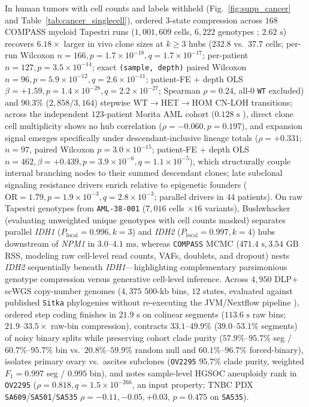 \documentclass[12pt]{article}
\begin{document}
In human tumors with cell counts and labels withheld (Fig.~\ref{fig:supp_cancer} and Table~\ref{tab:cancer_singlecell}), ordered 3-state compression across $168$ COMPASS myeloid Tapestri runs ($1,001,609$ cells, $6,222$ genotypes \cite{sollier2023compass}; $2.62\text{ s}$) recovers $6.18\times$ larger in vivo clone sizes at $k \ge 3$ hubs ($232.8$ vs.\ $37.7$ cells; per-run Wilcoxon $n=166, p = 1.7\times 10^{-18}, q = 1.7\times 10^{-17}$; per-patient $n=127, p = 3.5\times 10^{-14}$; exact \texttt{(sample, depth)} paired Wilcoxon $n=96, p = 5.9\times 10^{-12}, q = 2.6\times 10^{-11}$; patient-FE + depth OLS $\beta = +1.59, p = 1.4\times 10^{-28}, q = 2.2\times 10^{-27}$; Spearman $\rho = 0.24$, all-0 \texttt{WT} excluded) and $90.3\%$ ($2,858/3,164$) stepwise $\text{WT}\to\text{HET}\to\text{HOM}$ CN-LOH transitions; across the independent $123$-patient Morita AML cohort ($0.128\text{ s}$ \cite{morita2020clonal}), direct clone cell multiplicity shows no hub correlation ($\rho = -0.060, p = 0.197$), and expansion signal emerges specifically under descendant-inclusive lineage totals ($\rho = +0.331$; $n=97$, paired Wilcoxon $p = 3.0\times 10^{-15}$; patient-FE + depth OLS $n=462, \beta = +0.439, p = 3.9\times 10^{-6}, q = 1.1\times 10^{-5}$), which structurally couple internal branching nodes to their summed descendant clones; late subclonal signaling resistance drivers enrich relative to epigenetic founders ($\text{OR}=1.79, p = 1.9\times 10^{-3}, q = 2.8\times 10^{-3}$; parallel drivers in $44$ patients). On raw Tapestri genotypes from \texttt{AML-38-001} ($7,016$ cells $\times 16$ variants), Bushwhacker (evaluating unweighted unique genotypes with cell counts masked) separates parallel \textit{IDH1} ($P_{\text{local}}=0.996, k=3$) and \textit{IDH2} ($P_{\text{local}}=0.997, k=4$) hubs downstream of \textit{NPM1} in $3.0\text{--}4.1\text{ ms}$, whereas \texttt{COMPASS} MCMC ($471.4\text{ s}, 3.54\text{ GB}$ RSS, modeling raw cell-level read counts, VAFs, doublets, and dropout) nests \textit{IDH2} sequentially beneath \textit{IDH1}---highlighting complementary parsimonious genotype compression versus generative cell-level inference. Across $4,950$ DLP+ scWGS copy-number genomes ($4,375$ $500\text{-kb}$ bins, $12$ states, evaluated against published \texttt{Sitka} phylogenies without re-executing the JVM/Nextflow pipeline \cite{salehi2023sitka}), ordered step coding finishes in $21.9\text{ s}$ on colinear segments ($113.6\text{ s}$ raw bins; $21.9\text{--}33.5\times$ raw-bin compression), contracts $33.1\text{--}49.9\%$ ($39.0\text{--}53.1\%$ segments) of noisy binary splits while preserving cohort clade purity ($57.9\%\text{--}95.7\%$ seg / $60.7\%\text{--}95.7\%$ bin vs.\ $20.8\%\text{--}59.9\%$ random null and $60.1\%\text{--}96.7\%$ forced-binary), isolates primary ovary vs.\ ascites subclones (\texttt{OV2295} $95.7\%$ clade purity, weighted $F_1 = 0.997$ seg / $0.995$ bin), and notes sample-level HGSOC aneuploidy rank in \texttt{OV2295} ($\rho = 0.818, q = 1.5\times 10^{-266}$, an input property; TNBC PDX \texttt{SA609}/\texttt{SA501}/\texttt{SA535} $\rho = -0.11, -0.05, +0.03$, $p = 0.475$ on \texttt{SA535}).
\end{document}
